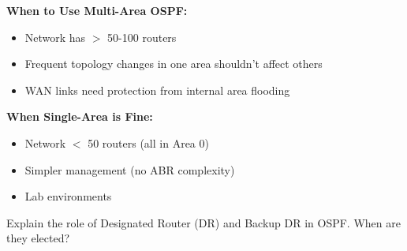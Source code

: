 \documentclass[12pt,a4paper]{article}
\begin{document}
\begin{abox}
\begin{center}
{
}
\end{center}

\textbf{When to Use Multi-Area OSPF:}
\begin{itemize}
    \item Network has $>$ 50-100 routers
    \item Frequent topology changes in one area shouldn't affect others
    \item WAN links need protection from internal area flooding
\end{itemize}

\textbf{When Single-Area is Fine:}
\begin{itemize}
    \item Network $<$ 50 routers (all in Area 0)
    \item Simpler management (no ABR complexity)
    \item Lab environments
\end{itemize}
\end{abox}


\begin{qbox}{Explain the role of Designated Router (DR) and Backup DR in OSPF. When are they elected?}
\end{qbox}
\end{document}
